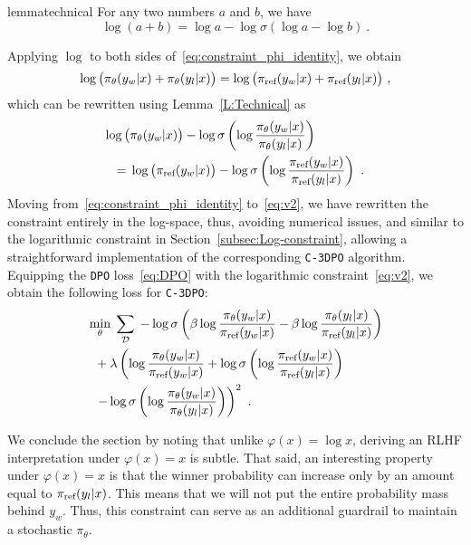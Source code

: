\begin{restatable}[]{lemma}{technical} \label{L:Technical}
For any two numbers $a$ and $b$, we have
%
\begin{equation*}
\log(a + b) = \log a - \log\sigma(\log a - \log b)\ . 
\end{equation*}
%
\end{restatable}
Applying $\log$ to both sides of~\eqref{eq:constraint_phi_identity}, we obtain
%
\begin{equation*}
\log\big(\pi_{\theta}(y_w|x) + \pi_{\theta}(y_l|x)\big)  = \log\big(\pi_{\textrm{ref}}(y_w|x) + \pi_{\textrm{ref}}(y_l|x)\big)\ ,
\end{equation*}
%
which can be rewritten using Lemma~\ref{L:Technical} as
%
\begin{align}
\label{eq:v2}
\log\big(&\pi_{\theta}(y_w|x)\big) - \log\sigma\left(\log\frac{\pi_{\theta}(y_w|x)}{\pi_\theta(y_l|x)}\right) \\  
=\; &\log\big(\pi_{\textrm{ref}}(y_w|x)\big) - \log\sigma\left(\log\frac{\pi_{\textrm{ref}}(y_w|x)}{\pi_{\textrm{ref}}(y_l|x)}\right)\ . \nonumber
\end{align}
%
Moving from~\eqref{eq:constraint_phi_identity} to~\eqref{eq:v2}, we have rewritten the constraint entirely in the log-space, thus, avoiding numerical issues, and similar to the logarithmic constraint in Section~\ref{subsec:Log-constraint}, allowing a straightforward implementation of the corresponding \texttt{C-3DPO} algorithm. Equipping the \texttt{DPO} loss~\eqref{eq:DPO} with the logarithmic constraint~\eqref{eq:v2}, we obtain the following loss for \texttt{C-3DPO}: 
%
\begin{align}
&\min_{\theta}\;\sum_{\mathcal{D}} \; -\log \sigma\left(\beta\log\frac{\pi_{\theta}(y_w|x)}{\pi_{\textrm{ref}}(y_w|x)} - \beta\log\frac{\pi_{\theta}(y_l|x)}{\pi_{\textrm{ref}}(y_l|x)}\right) \nonumber \\ 
&\;\;+\lambda\left(\log\frac{\pi_{\theta}(y_w|x)}{\pi_{\textrm{ref}}(y_w|x)} + \log\sigma\left(\log\frac{\pi_{\textrm{ref}}(y_w|x)}{\pi_{\textrm{ref}}(y_l|x)}\right) \right. \nonumber \\
&\;\; \left. - \log\sigma\left(\log\frac{\pi_{\theta}(y_w|x)}{\pi_\theta(y_l|x)}\right)\right)^{2}\ .
\label{eq:C-3DPO-log}
\end{align}

We conclude the section by noting that unlike $\varphi(x)=\log x$, deriving an RLHF interpretation under $\varphi(x)= x$ is subtle. That said, an interesting property under $\varphi(x)= x$ is that the winner probability can increase only by an amount equal to $\pi_{\textrm{ref}}(y_l|x)$. This means that we will not put the entire probability mass behind $y_w$. Thus, this constraint can serve as an additional guardrail to maintain a stochastic $\pi_\theta$. 
